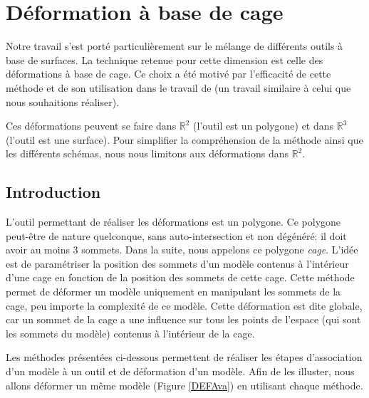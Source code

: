 

\chapter{Déformation à base de cage}

\graphicspath{ {Chapter2/Chapter2Figs/PNG/}
  {Chapter2/Chapter2Figs/PDF/} {Chapter2/Chapter2Figs/} }

Notre travail s'est porté particulièrement sur le mélange de différents outils
à base de surfaces. La technique retenue pour cette dimension est celle des
déformations à base de cage. Ce choix a été motivé par l'efficacité de cette
méthode et de son utilisation dans le travail de \cite{GPCP13} (un travail
similaire à celui que nous souhaitions réaliser).

Ces déformations peuvent se faire dans $\mathbb{R}^2$ (l'outil est un
polygone) et dans $\mathbb{R}^3$ (l'outil est une surface). Pour simplifier la
compréhension de la méthode ainsi que les différents schémas, nous nous
limitons aux déformations dans $\mathbb{R}^2$.

\section{Introduction} 

L'outil permettant de réaliser les déformations est un polygone. Ce polygone
peut-être de nature quelconque, sans auto-intersection et non dégénéré: il
doit avoir au moins 3 sommets. Dans la suite, nous appelons ce polygone
\textit{cage}. L'idée est de paramétriser la position des sommets d'un modèle
contenus à l'intérieur d'une cage en fonction de la position des sommets de
cette cage. Cette méthode permet de déformer un modèle uniquement en
manipulant les sommets de la cage, peu importe la complexité de ce modèle.
Cette déformation est dite globale, car un sommet de la cage a une influence
sur tous les points de l'espace (qui sont les sommets du modèle) contenus à
l'intérieur de la cage.

Les méthodes présentées ci-dessous permettent de réaliser les étapes
d'association d'un modèle à un outil et de déformation d'un modèle. Afin de
les illuster, nous allons déformer un même modèle (Figure \ref{DEFAva}) en
utilisant chaque méthode.

